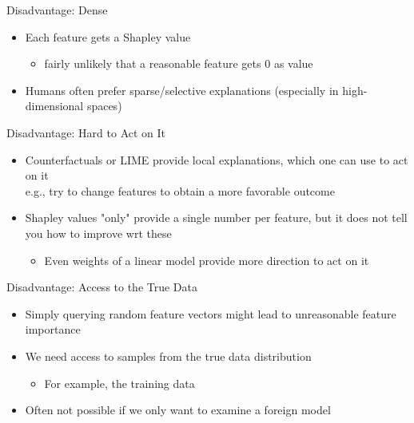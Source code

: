 \documentclass[aspectratio=169]{../latex_main/tntbeamer}  %
\begin{document}
\begin{frame}{Disadvantage: Dense}
    
    \begin{itemize}
        \item Each feature gets a Shapley value
        \begin{itemize}
            \item fairly unlikely that a reasonable feature gets $0$ as value
        \end{itemize}
        \item Humans often prefer sparse/selective explanations (especially in high-dimensional spaces)
    \end{itemize}
    
\end{frame}

\begin{frame}{Disadvantage: Hard to Act on It}
    
    \begin{itemize}
        \item Counterfactuals or LIME provide local explanations, which one can use to act on it\\ e.g., try to change features to obtain a more favorable outcome
        \item Shapley values "only" provide a single number per feature, but it does not tell you how to improve wrt these
        \begin{itemize}
            \item Even weights of a linear model provide more direction to act on it
        \end{itemize}
        
    \end{itemize}
    
\end{frame}

\begin{frame}{Disadvantage: Access to the True Data}
    
    \begin{itemize}
        \item Simply querying random feature vectors might lead to unreasonable feature importance
        \item We need access to samples from the true data distribution
        \begin{itemize}
            \item For example, the training data
        \end{itemize}
        \item Often not possible if we only want to examine a foreign model
    \end{itemize}
    
\end{frame}
\end{document}
